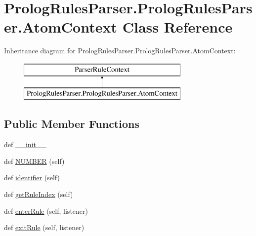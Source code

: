 \hypertarget{class_prolog_rules_parser_1_1_prolog_rules_parser_1_1_atom_context}{}\section{Prolog\+Rules\+Parser.\+Prolog\+Rules\+Parser.\+Atom\+Context Class Reference}
\label{class_prolog_rules_parser_1_1_prolog_rules_parser_1_1_atom_context}
Inheritance diagram for Prolog\+Rules\+Parser.\+Prolog\+Rules\+Parser.\+Atom\+Context\+:\begin{figure}[H]
\begin{center}
\leavevmode
\includegraphics[height=2.000000cm]{class_prolog_rules_parser_1_1_prolog_rules_parser_1_1_atom_context}
\end{center}
\end{figure}
\subsection*{Public Member Functions}
\begin{DoxyCompactItemize}
\item 
def \hyperlink{class_prolog_rules_parser_1_1_prolog_rules_parser_1_1_atom_context_ade2e61ecb9a528e958814fb70d76a4b8}{\+\_\+\+\_\+init\+\_\+\+\_\+}
\item 
def \hyperlink{class_prolog_rules_parser_1_1_prolog_rules_parser_1_1_atom_context_a4eea8ead093ada75092e215728604b31}{N\+U\+M\+B\+E\+R} (self)
\item 
def \hyperlink{class_prolog_rules_parser_1_1_prolog_rules_parser_1_1_atom_context_a9166f9e79a4a3a62d4465407c375a52a}{identifier} (self)
\item 
def \hyperlink{class_prolog_rules_parser_1_1_prolog_rules_parser_1_1_atom_context_a6fbdeee4afaad7b66848f7be5e97dd58}{get\+Rule\+Index} (self)
\item 
def \hyperlink{class_prolog_rules_parser_1_1_prolog_rules_parser_1_1_atom_context_ab5403293233289dd5274f3233fd497d3}{enter\+Rule} (self, listener)
\item 
def \hyperlink{class_prolog_rules_parser_1_1_prolog_rules_parser_1_1_atom_context_a2ed6f6b49de2a40c4a316cb0a7d11b1f}{exit\+Rule} (self, listener)
\end{DoxyCompactItemize}
